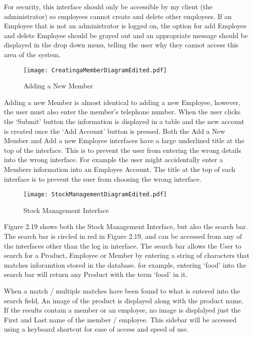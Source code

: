For security, this interface should only be accessible by my client (the administrator) so employees cannot create and delete other employees. If an Employee that is not an administrator is logged on, the option for add Employee and delete Employee should be grayed out and an appropriate message should be displayed in the drop down menu, telling the user why they cannot access this area of the system. \par

\begin{figure}[H]
\caption{Adding a New Member} \label{fig:Adding a New Member Interface}
\hfill\texttt{[image: CreatingaMemberDiagramEdited.pdf]}\hspace*{\fill}
\end{figure}

Adding a new Member is almost identical to adding a new Employee, however, the user must also enter the member's telephone number. When the user clicks the `Submit' button the information is displayed in a table and the new account is created once the `Add Account' button is pressed. Both the Add a New Member and Add a new Employee interfaces have a large underlined title at the top of the interface. This is to prevent the user from entering the wrong details into the wrong interface. For example the user might accidentally enter a Members information into an Employee Account. The title at the top of each interface is to prevent the suer from choosing the wrong interface. \par

\begin{figure}[H]
\caption{Stock Management Interface} \label{fig:Stock Management Interface}
\hfill\texttt{[image: StockManagementDiagramEdited.pdf]}\hspace*{\fill}
\end{figure}

Figure 2.19 shows both the Stock Management Interface, but also the search bar. The search bar is circled in red in Figure 2.19, and can be accessed from any of the interfaces other than the log in interface. The search bar allows the User to search for a Product, Employee or Member by entering a string of characters that matches inforamtion stored in the database. for example, entering `food' into the search bar will return any Product with the term `food' in it. \par

  When a match / multiple matches have been found to what is entered into the search field, An image of the product is displayed along with the product name. If the results contain a member or an employee, no image is displalyed just the First and Last name of the member / employee. This sidebar will be accessed using a keyboard shortcut for ease of access and speed of use. \par


